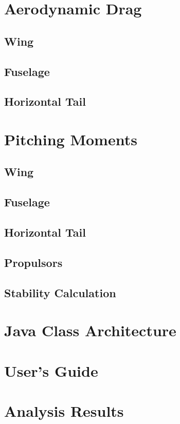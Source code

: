 \section{Aerodynamic Drag}
\subsection{Wing}
\subsection{Fuselage}
\subsection{Horizontal Tail}
\section{Pitching Moments}
\subsection{Wing}
\subsection{Fuselage}
\subsection{Horizontal Tail}
\subsection{Propulsors}

\subsection{Stability Calculation}


\section{Java Class Architecture}

\section{User's Guide}

\section{Analysis Results} %
